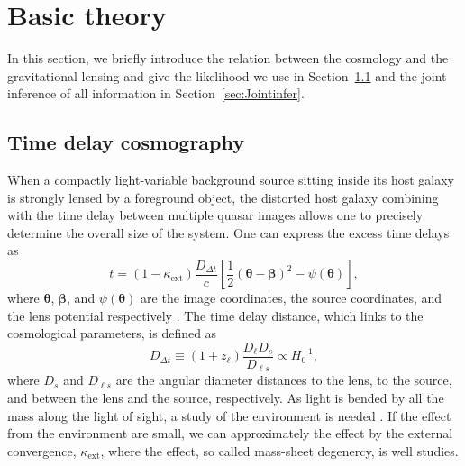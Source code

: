 \documentclass[useAMS,usenatbib]{mnras}
\newcommand{\sref}[1]{Section~\ref{#1}}
\def\zl{z_{\ell}}
\def\dt{D_{\Delta t}}
\begin{document}
\section{Basic theory}
\label{sec:basic}
In this section, we briefly introduce the relation between the cosmology and the gravitational lensing and give the likelihood we use in \sref{sec:TDcosmo} and the joint inference of all information in \sref{sec:Jointinfer}.

\subsection{Time delay cosmography}
\label{sec:TDcosmo} %
When a compactly light-variable background source sitting inside its host galaxy is strongly lensed by a foreground object, the distorted host galaxy combining with the time delay between multiple quasar images allows one to precisely determine the overall size of the system. One can express the excess time delays as
\begin{equation}
\label{eq:theory}
t=(1-\kappa_{\textrm{ext}})\frac{\dt}{c}\left[\frac{1}{2}
\left(\boldsymbol{\theta}-\boldsymbol{\beta}\right)^{2}-\psi\left(\boldsymbol{\theta}\right)\right],
\end{equation}
where $\bm{\theta}$, $\bm{\beta}$, and
$\psi\left(\bm{\theta}\right)$ are the image coordinates, the source
coordinates, and the lens potential respectively \citep{Shapiro64, Refsdal64}.
The time delay distance, which links to the cosmological parameters, %
is defined as
\begin{equation}
\label{eq:TDdistance}
\dt\equiv\left(1+
\zl\right)\frac{D_{\ell}D_{s}}{{D_{\ell s}}}\propto H_{0}^{-1},
\end{equation}
where $D_{s}$ and $D_{\ell s}$ are the angular diameter distances to the lens, to the source, and between the lens and the source, respectively. 
As light is bended by all the mass along the light of sight, a study of the environment is needed \citep[e.g., the mass contributed from cluster or nearby galaxies][]{SuyuEtal10,FassnachtEtal11,RusuEtal17,TihhonovaEtal17}. If the effect from the environment are small, we can approximately the effect by the external convergence, $\kappa_{\textrm{ext}}$, where the effect, so called mass-sheet degenercy, is well studies. 
\end{document}

